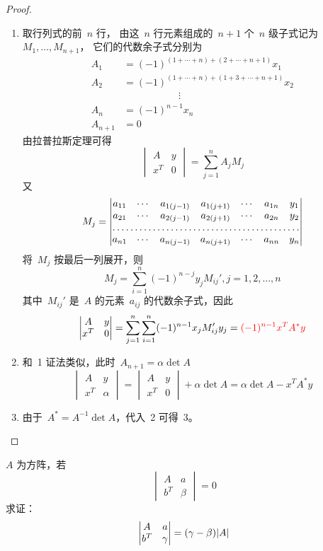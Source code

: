 \documentclass[twoside,openright]{book}
\begin{document}
\begin{CJK*}{UTF8}{}
\begin{proof}
\begin{enumerate}
\item
取行列式的前\ $n$ 行，
由这\ $n$ 行元素组成的\ $n+1$ 个\ $n$ 级子式记为\ $M_1,\dotsc,M_{n+1}$，
它们的代数余子式分别为
\[
\begin{aligned}
A_1&=(-1)^{(1+\dotsb+n)+(2+\dotsb+n+1)}x_1   \\
A_2&=(-1)^{(1+\dotsb+n)+(1+3+\dotsb+n+1)}x_2 \\
   & \mspace{100mu} \vdots                   \\
A_n&=(-1)^{n-1}x_n                           \\
A_{n+1}&=0
\end{aligned}
\]
由拉普拉斯定理可得
\[
\begin{vmatrix}
A & y \\
x^T & 0
\end{vmatrix}
=
\sum_{j=1}^n A_jM_j
\]
又
\[
M_j
=
\begin{vmatrix}
a_{11} & \dotsm & a_{1(j-1)} & a_{1(j+1)}& \dotsm & a_{1n} & y_1\\
a_{21} & \dotsm & a_{2(j-1)} & a_{2(j+1)}& \dotsm & a_{2n} & y_2\\
\hdotsfor{7} \\
a_{n1} & \dotsm & a_{n(j-1)} & a_{n(j+1)}& \dotsm & a_{nn} & y_n\\
\end{vmatrix}
\]
将\ $M_j$ 按最后一列展开，则
\[
M_j=\sum_{i=1}^n (-1)^{n-j}y_j M_{ij}',j=1,2,\dotsc,n
\]
其中\ $M_{ij}'$ 是\ $A$ 的元素\ $a_{ij}$ 的代数余子式，因此
\[
\begin{vmatrix} A & y \\ x^T & 0 \end{vmatrix} = \sum_{j=1}^n \sum_{i=1}^n(-1)^{n-1} x_jM_{ij}'y_j={\color{red}(-1)^{n-1}x^TA^*y}
\]
\item
和\ 1 证法类似，此时\ $A_{n+1}=\alpha \det A$
\[
\begin{vmatrix}
A & y \\
x^T & \alpha
\end{vmatrix}
=
\begin{vmatrix}
A & y \\
x^T & 0
\end{vmatrix}+
\alpha \det A=\alpha \det A-x^TA^*y
\]
\item
由于\ $A^*= A^{-1}\det A$，代入\ 2 可得\ 3。
\end{enumerate}
\end{proof}

\begin{quest}
\label{quest:74}
$A$ 为方阵，若
\[
\begin{vmatrix}
A & a \\
b^T & \beta
\end{vmatrix}
=0
\]
求证：
\[
\begin{vmatrix}
A & a \\
b^T & \gamma
\end{vmatrix}
=(\gamma-\beta)\lvert{A}\rvert
\]
\end{quest}


\end{CJK*}
\end{document}
